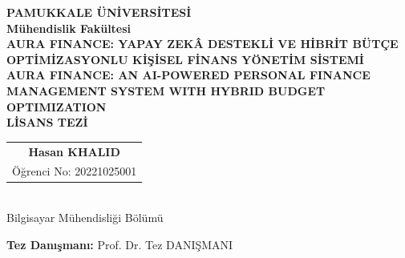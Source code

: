 \begin{titlepage}
\begin{center}

\vspace*{1cm}

{\Large \textbf{PAMUKKALE ÜNİVERSİTESİ}}\\[0.3cm]
{\large \textbf{Mühendislik Fakültesi}}\\[2cm]

{\Large \textbf{AURA FINANCE: YAPAY ZEKÂ DESTEKLİ VE HİBRİT BÜTÇE OPTİMİZASYONLU KİŞİSEL FİNANS YÖNETİM SİSTEMİ}}\\[0.4cm]
{\large \textbf{AURA FINANCE: AN AI-POWERED PERSONAL FINANCE MANAGEMENT SYSTEM WITH HYBRID BUDGET OPTIMIZATION}}\\[2cm]

{\Large \textbf{LİSANS TEZİ}}\\[2cm]

\begin{tabular}{c}
{\large \textbf{Hasan KHALID}} \\
{\large Öğrenci No: 20221025001} \\
\end{tabular}
\\[2cm]

{\large Bilgisayar Mühendisliği Bölümü}\\[2.5cm]

\vfill

\textbf{Tez Danışmanı:} Prof. Dr. Tez DANIŞMANI


\end{center}
\end{titlepage}
